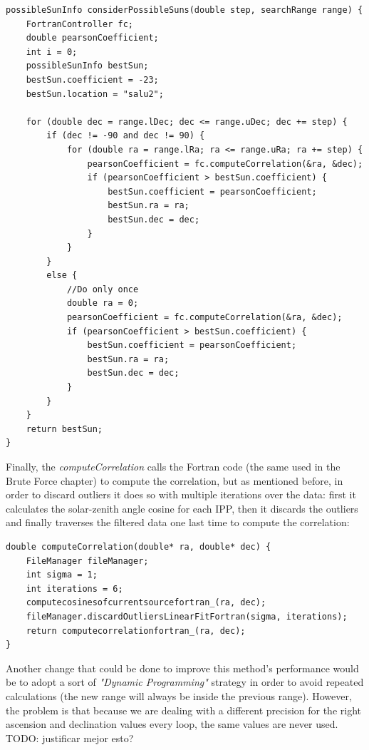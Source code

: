 \begin{minipage}{\linewidth}
	\begin{lstlisting}[style=myCStyle, caption=Iterating over possible locations within the given range]
possibleSunInfo considerPossibleSuns(double step, searchRange range) {
	FortranController fc;
	double pearsonCoefficient;
	int i = 0;
	possibleSunInfo bestSun;
	bestSun.coefficient = -23;
	bestSun.location = "salu2";
	
	for (double dec = range.lDec; dec <= range.uDec; dec += step) {
		if (dec != -90 and dec != 90) {
			for (double ra = range.lRa; ra <= range.uRa; ra += step) {
				pearsonCoefficient = fc.computeCorrelation(&ra, &dec);
				if (pearsonCoefficient > bestSun.coefficient) {
					bestSun.coefficient = pearsonCoefficient;
					bestSun.ra = ra;
					bestSun.dec = dec;
				}
			}
		}
		else {
			//Do only once
			double ra = 0;
			pearsonCoefficient = fc.computeCorrelation(&ra, &dec);
			if (pearsonCoefficient > bestSun.coefficient) {
				bestSun.coefficient = pearsonCoefficient;
				bestSun.ra = ra;
				bestSun.dec = dec;
			}
		}
	}
	return bestSun;
}\end{lstlisting}
\end{minipage}

Finally, the \textit{computeCorrelation} calls the Fortran code (the same used in the Brute Force chapter) to compute the correlation, but as mentioned before, in order to discard outliers it does so with multiple iterations over the data: first it calculates the solar-zenith angle cosine for each IPP, then it discards the outliers and finally traverses the filtered data one last time to compute the correlation:

\begin{minipage}{\linewidth}
\begin{lstlisting}[style=myCStyle, caption=Discarding outliers and computing the correlation]
double computeCorrelation(double* ra, double* dec) {
	FileManager fileManager;
	int sigma = 1;
	int iterations = 6;
	computecosinesofcurrentsourcefortran_(ra, dec);
	fileManager.discardOutliersLinearFitFortran(sigma, iterations);	
	return computecorrelationfortran_(ra, dec);
}\end{lstlisting}
\end{minipage}

Another change that could be done to improve this method's performance would be to adopt a sort of \textit{"Dynamic Programming"} strategy in order to avoid repeated calculations (the new range will always be inside the previous range). However, the problem is that because we are dealing with a different precision for the right ascension and declination values every loop, the same values are never used. TODO: justificar mejor esto? \\

